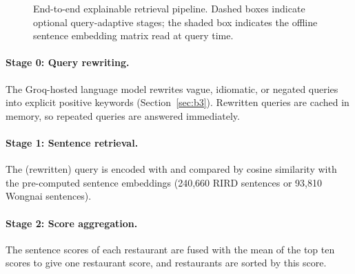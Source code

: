 \begin{figure}[htbp]
{%
    }
    \caption{End-to-end explainable retrieval pipeline. Dashed boxes indicate optional query-adaptive stages; the shaded box indicates the offline sentence embedding matrix read at query time.}
    \label{fig:pipeline}
\end{figure}

\paragraph{Stage 0: Query rewriting.} The Groq-hosted language model rewrites vague, idiomatic, or negated queries into explicit positive keywords (Section~\ref{sec:b3}). Rewritten queries are cached in memory, so repeated queries are answered immediately.

\paragraph{Stage 1: Sentence retrieval.} The (rewritten) query is encoded with \mpnet{} and compared by cosine similarity with the pre-computed sentence embeddings (240,660 RIRD sentences or 93,810 Wongnai sentences).

\paragraph{Stage 2: Score aggregation.} The sentence scores of each restaurant are fused with the mean of the top ten scores to give one restaurant score, and restaurants are sorted by this score.

